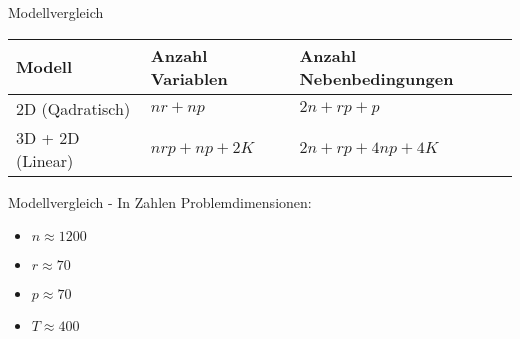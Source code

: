 \documentclass[11pt]{beamer}
\begin{document}
  \begin{frame}
                {Modellvergleich}
                
        \begin{center}
        \begin{tabular}{ | l | l | l |}
            \hline 
            Modell & Anzahl Variablen & Anzahl Nebenbedingungen \\
            \hline \hline
            2D (Qadratisch)  & $nr + np$ & $2n + rp + p$ \\ \hline
            3D + 2D (Linear) & $nrp + np + 2K$ & $2n + rp + 4np + 4 K$\\ \hline
            
        \end{tabular}
        \end{center}
    \end{frame}
    \begin{frame}
            {Modellvergleich - In Zahlen}
       Problemdimensionen:
        \begin{itemize}
        \item $n \approx 1200$
        \item $r \approx 70$
        \item $p \approx 70$
        \item $T \approx 400$
        \end{itemize}
        
  \end{frame}
  
\end{document}
